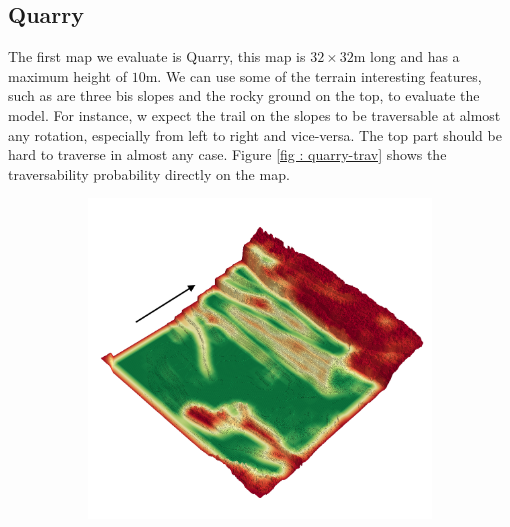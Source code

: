 \documentclass[../document.tex]{subfiles}
\begin{document}
\subsection{Quarry}
The first map we evaluate is Quarry, this map is $32\times 32$m long and has a maximum height of $10$m. We can use some of the terrain interesting features, such as are three bis slopes and the rocky ground on the top, to evaluate the model. For instance, w expect the trail on the slopes to be traversable at almost any rotation, especially from left to right and vice-versa. The top part should be hard to traverse in almost any case. Figure \ref{fig : quarry-trav} shows the traversability probability directly on the map. 
\begin{figure} [htbp]
\centering
\begin{subfigure}[b]{0.45\textwidth}
  \includegraphics[width=\linewidth]{../img/4/traversability/quarry/-270.png} 
\end{subfigure}
\begin{subfigure}[b]{0.45\textwidth}

\end{subfigure}
\end{figure}
\end{document}

